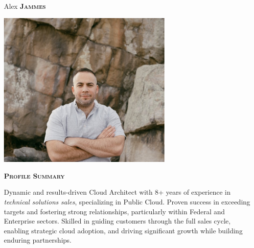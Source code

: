 \documentclass[11pt, a4paper]{article}
\newcommand{\headleft}[1]{\vspace*{3ex}\textsc{\textbf{#1}}\par%
    \vspace*{-1.5ex}\hrulefill\par\vspace*{0.7ex}}
\begin{document}
\setlength{\topskip}{0pt}
\setlength{\parindent}{0pt}
\setlength{\parskip}{0pt}
\setlength{\fboxsep}{0pt}
\pagestyle{empty}
\raggedbottom

\begin{minipage}[t]{0.28\textwidth} %
\colorbox{cvblue}{\begin{minipage}[t][5mm][t]{\textwidth}\null\hfill\null\end{minipage}}

\vspace{-.2ex} %
\colorbox{cvblue!90}{\color{white}  %
\textwidth\relax%
\begin{minipage}[t][293mm][t]{0.82\textwidth}
\raggedright
\vspace*{2.5ex}

\Large Alex \textbf{\textsc{Jammes}} \normalsize

\null\hfill\includegraphics[width=0.65\textwidth]{images/resume_profile_picture.jpg}\hfill\null

\vspace*{0.5ex} %

\headleft{Profile Summary}
Dynamic and results-driven Cloud Architect with 8+ years of experience in \textit{technical solutions sales}, specializing in Public Cloud. Proven success in exceeding targets and fostering strong relationships, particularly within Federal and Enterprise sectors. Skilled in guiding customers through the full sales cycle, enabling strategic cloud adoption, and driving significant growth while building enduring partnerships.


\end{minipage}}
\end{minipage}
\end{document}
